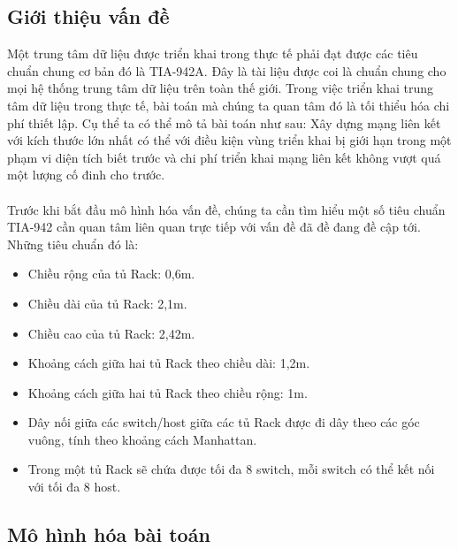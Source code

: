 \documentclass[../report.tex]{subfiles}
\begin{document}
\subsection{Giới thiệu vấn đề}
Một trung tâm dữ liệu được triển khai trong thực tế phải đạt được các tiêu chuẩn chung cơ bản đó là TIA-942A. Đây là tài liệu được coi là chuẩn chung cho mọi hệ thống trung tâm dữ liệu trên toàn thế giới. Trong việc triển khai trung tâm dữ liệu trong thực tế, bài toán mà chúng ta quan tâm đó là tối thiểu hóa chi phí thiết lập. Cụ thể ta có thể mô tả bài toán như sau:
Xây dựng mạng liên kết với kích thước lớn nhất có thể với điều kiện vùng triển khai bị giới hạn trong một phạm vi diện tích biết trước và chi phí triển khai mạng liên kết không vượt quá một lượng cố đinh cho trước.

\paragraph*{}
Trước khi bắt đầu mô hình hóa vấn đề, chúng ta cần tìm hiểu một số tiêu chuẩn TIA-942 cần quan tâm liên quan trực tiếp với vấn đề đã đề đang đề cập tới. Những tiêu chuẩn đó là:
\begin{itemize}
    \item Chiều rộng của tủ Rack: 0,6m.
    \item Chiều dài của tủ Rack: 2,1m.
    \item Chiều cao của tủ Rack: 2,42m.
    \item Khoảng cách giữa hai tủ Rack theo chiều dài: 1,2m.
    \item Khoảng cách giữa hai tủ Rack theo chiều rộng: 1m.
    \item Dây nối giữa các switch/host giữa các tủ Rack được đi dây theo các góc vuông, tính theo khoảng cách Manhattan.
    \item Trong một tủ Rack sẽ chứa được tối đa 8 switch, mỗi switch có thể kết nối với tối đa 8 host.
\end{itemize}

\subsection{Mô hình hóa bài toán}
\end{document}
